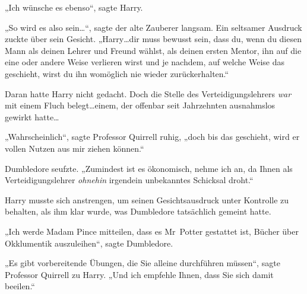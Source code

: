 „Ich wünsche es ebenso“, sagte Harry.

„So wird es also sein…“, sagte der alte Zauberer langsam. Ein seltsamer Ausdruck zuckte über sein Gesicht. „Harry…dir muss bewusst sein, dass du, wenn du diesen Mann als deinen Lehrer und Freund wählst, als deinen ersten Mentor, ihn auf die eine oder andere Weise verlieren wirst und je nachdem, auf welche Weise das geschieht, wirst du ihn womöglich nie wieder zurückerhalten.“

Daran hatte Harry nicht gedacht. Doch die Stelle des Verteidigungslehrers \emph{war} mit einem Fluch belegt…einem, der offenbar seit Jahrzehnten ausnahmslos gewirkt hatte…

„Wahrscheinlich“, sagte Professor Quirrell ruhig, „doch bis das geschieht, wird er vollen Nutzen aus mir ziehen können.“

Dumbledore seufzte. „Zumindest ist es ökonomisch, nehme ich an, da Ihnen als Verteidigungslehrer \emph{ohnehin} irgendein unbekanntes Schicksal droht.“

Harry musste sich anstrengen, um seinen Gesichtsausdruck unter Kontrolle zu behalten, als ihm klar wurde, was Dumbledore tatsächlich gemeint hatte.

„Ich werde Madam Pince mitteilen, dass es Mr~Potter gestattet ist, Bücher über Okklumentik auszuleihen“, sagte Dumbledore.

„Es gibt vorbereitende Übungen, die Sie alleine durchführen müssen“, sagte Professor Quirrell zu Harry. „Und ich empfehle Ihnen, dass Sie sich damit beeilen.“


